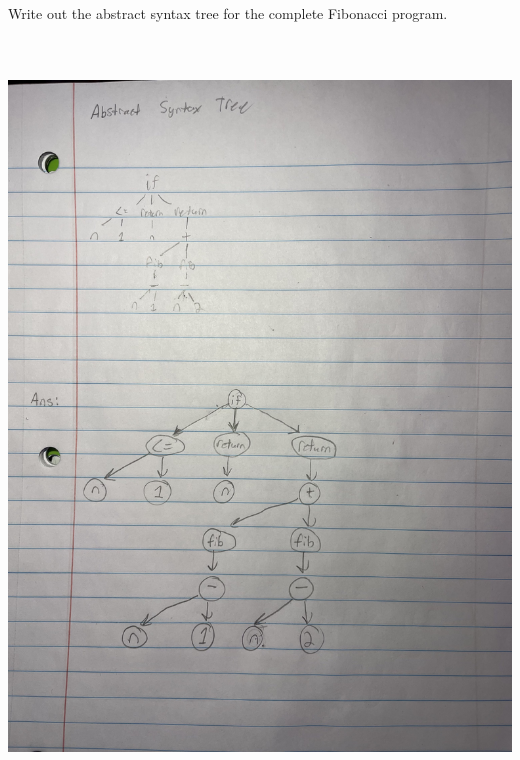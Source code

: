 \documentclass{article}
\theoremstyle{theorem}
\theoremstyle{definition}
\theoremstyle{remark}
\begin{document}
Write out the abstract syntax tree for the complete Fibonacci program.
\medskip\begin{center}
\includegraphics[width=15cm, height=20cm]{Week4P2.pdf}
\end{center}
\clearpage
\end{document}
